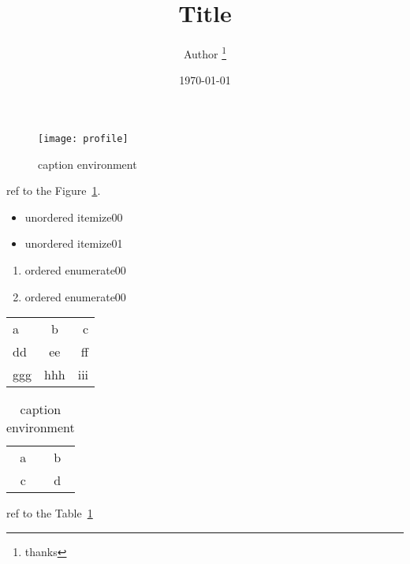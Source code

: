 \documentclass{article}
\title{Title}
\author{Author \thanks{thanks}}
\date{\today}
\begin{document}
\maketitle

\listoffigures

\listoftables

\newpage

\begin{figure}[h]
    \centering
    \texttt{[image: profile]}
    \caption{\label{fig:00}caption environment}%
\end{figure}

ref to the Figure~\ref{fig:00}.

\begin{itemize}
    \item unordered itemize00
    \item unordered itemize01
\end{itemize}

\begin{enumerate}
    \item ordered enumerate00
    \item ordered enumerate00
\end{enumerate}

\begin{tabular}{||l|c|r||}
    \hline
    a & b & c\\
    dd & ee & ff\\
    ggg & hhh & iii\\
    \hline \hline
\end{tabular}

\begin{table}[h!]
    \centering
    \begin{tabular}{|c|c|}
        \hline
        a & b\\
        c & d\\
        \hline
    \end{tabular}
    \caption{\label{table:00}caption environment}
\end{table}

ref to the Table~\ref{table:00}
\end{document}
